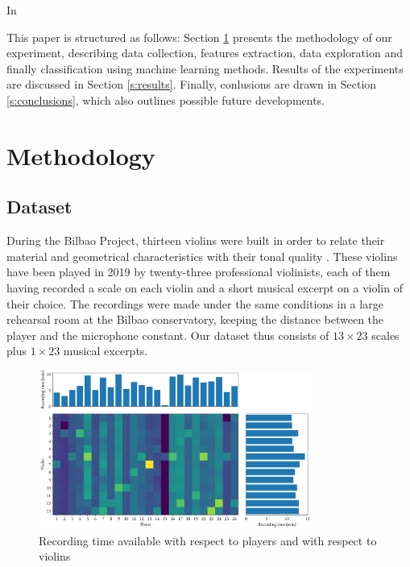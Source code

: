 \documentclass[letterpaper,11pt,leqno]{article}
\begin{document}
In \cite{zhaoViolinistIdentificationUsing2022}

This paper is structured as follows: Section \ref{s:methodology} presents the methodology of our experiment, describing data collection, features extraction, data exploration and finally classification using machine learning methods. Results of the experiments are discussed in Section \ref{s:results}. Finally, conlusions are drawn in Section \ref*{s:conclusions}, which also outlines possible future developments. 

\section{Methodology}\label{s:methodology}

\subsection{Dataset}

During the Bilbao Project, thirteen violins were built in order to relate their material and geometrical characteristics with their tonal quality \citep{fritzBilbaoProjectSearching2021}. These violins have been played in 2019 by twenty-three professional violinists, each of them having recorded a scale on each violin and a short musical excerpt on a violin of their choice. The recordings were made under the same conditions in a large rehearsal room at the Bilbao conservatory, keeping the distance between the player and the microphone constant. Our dataset thus consists of $13 \times 23$ scales plus $1 \times 23$ musical excerpts.

\begin{figure}[h]
	\includegraphics[width=0.8\textwidth]{../figures/class_weights.png}
	\caption{Recording time available with respect to players and with respect to violins}
\end{figure}
\end{document}
